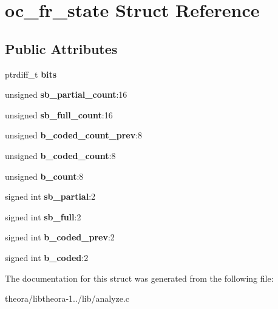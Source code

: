 \hypertarget{structoc__fr__state}{\section{oc\+\_\+fr\+\_\+state Struct Reference}
\label{structoc__fr__state}
}
\subsection*{Public Attributes}
\begin{DoxyCompactItemize}
\item 
\hypertarget{structoc__fr__state_a0344bf4af7f52b7ab01d452920a07908}{ptrdiff\+\_\+t {\bfseries bits}}\label{structoc__fr__state_a0344bf4af7f52b7ab01d452920a07908}

\item 
\hypertarget{structoc__fr__state_a8cdd7668589e99eba0f379c513f16b74}{unsigned {\bfseries sb\+\_\+partial\+\_\+count}\+:16}\label{structoc__fr__state_a8cdd7668589e99eba0f379c513f16b74}

\item 
\hypertarget{structoc__fr__state_aa602785d4322d51bf834874e7597bb50}{unsigned {\bfseries sb\+\_\+full\+\_\+count}\+:16}\label{structoc__fr__state_aa602785d4322d51bf834874e7597bb50}

\item 
\hypertarget{structoc__fr__state_a109e992ba46da5f9ffe40e1f7e5bc3af}{unsigned {\bfseries b\+\_\+coded\+\_\+count\+\_\+prev}\+:8}\label{structoc__fr__state_a109e992ba46da5f9ffe40e1f7e5bc3af}

\item 
\hypertarget{structoc__fr__state_a6a3d7b37cd10ead5675c73d9bf1efb4b}{unsigned {\bfseries b\+\_\+coded\+\_\+count}\+:8}\label{structoc__fr__state_a6a3d7b37cd10ead5675c73d9bf1efb4b}

\item 
\hypertarget{structoc__fr__state_a6b6f3a66fe6d4cbc04341de7c6ca23e2}{unsigned {\bfseries b\+\_\+count}\+:8}\label{structoc__fr__state_a6b6f3a66fe6d4cbc04341de7c6ca23e2}

\item 
\hypertarget{structoc__fr__state_ad801c6270e6fbdc6a7948a445d25b359}{signed int {\bfseries sb\+\_\+partial}\+:2}\label{structoc__fr__state_ad801c6270e6fbdc6a7948a445d25b359}

\item 
\hypertarget{structoc__fr__state_acf772170a9c6f03dcdc47b45ff078cf3}{signed int {\bfseries sb\+\_\+full}\+:2}\label{structoc__fr__state_acf772170a9c6f03dcdc47b45ff078cf3}

\item 
\hypertarget{structoc__fr__state_a1f53ab6e81fd28c598c5504ecaa12bbc}{signed int {\bfseries b\+\_\+coded\+\_\+prev}\+:2}\label{structoc__fr__state_a1f53ab6e81fd28c598c5504ecaa12bbc}

\item 
\hypertarget{structoc__fr__state_a82232027013de502340b3d78468a6796}{signed int {\bfseries b\+\_\+coded}\+:2}\label{structoc__fr__state_a82232027013de502340b3d78468a6796}

\end{DoxyCompactItemize}


The documentation for this struct was generated from the following file\+:\begin{DoxyCompactItemize}
\item 
theora/libtheora-\/1../lib/analyze.\+c\end{DoxyCompactItemize}
